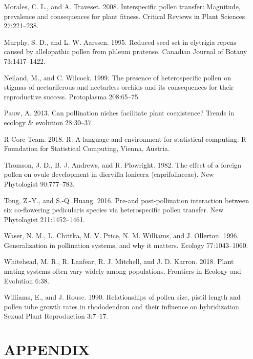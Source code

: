 \documentclass[11pt,a4paper]{article}
\begin{document}
\hypertarget{ref-morales2008}{}
Morales, C. L., and A. Traveset. 2008. Interspecific pollen transfer:
Magnitude, prevalence and consequences for plant fitness. Critical
Reviews in Plant Sciences 27:221--238.

\hypertarget{ref-murphy1995}{}
Murphy, S. D., and L. W. Aarssen. 1995. Reduced seed set in elytrigia
repens caused by allelopathic pollen from phleum pratense. Canadian
Journal of Botany 73:1417--1422.

\hypertarget{ref-neiland1999}{}
Neiland, M., and C. Wilcock. 1999. The presence of heterospecific pollen
on stigmas of nectariferous and nectarless orchids and its consequences
for their reproductive success. Protoplasma 208:65--75.

\hypertarget{ref-pauw2013}{}
Pauw, A. 2013. Can pollination niches facilitate plant coexistence?
Trends in ecology \& evolution 28:30--37.

\hypertarget{ref-R_Core_Team_2018}{}
R Core Team. 2018. R: A language and environment for statistical
computing. R Foundation for Statistical Computing, Vienna, Austria.

\hypertarget{ref-thomson1982}{}
Thomson, J. D., B. J. Andrews, and R. Plowright. 1982. The effect of a
foreign pollen on ovule development in diervilla lonicera
(caprifoliaceae). New Phytologist 90:777--783.

\hypertarget{ref-tong2016}{}
Tong, Z.-Y., and S.-Q. Huang. 2016. Pre-and post-pollination interaction
between six co-flowering pedicularis species via heterospecific pollen
transfer. New Phytologist 211:1452--1461.

\hypertarget{ref-waser1996}{}
Waser, N. M., L. Chittka, M. V. Price, N. M. Williams, and J. Ollerton.
1996. Generalization in pollination systems, and why it matters. Ecology
77:1043--1060.

\hypertarget{ref-whitehead2018}{}
Whitehead, M. R., R. Lanfear, R. J. Mitchell, and J. D. Karron. 2018.
Plant mating systems often vary widely among populations. Frontiers in
Ecology and Evolution 6:38.

\hypertarget{ref-williams1990}{}
Williams, E., and J. Rouse. 1990. Relationships of pollen size, pistil
length and pollen tube growth rates in rhododendron and their influence
on hybridization. Sexual Plant Reproduction 3:7--17.

\section{APPENDIX}\label{appendix}
\end{document}
